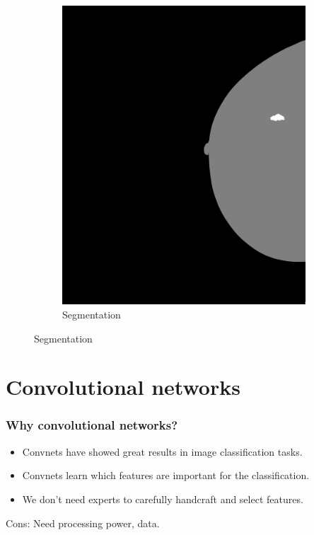 \documentclass{beamer}
\begin{document}
\begin{frame}
\begin{figure}[h]
\begin{subfigure}{0.35\textwidth}
				\includegraphics[width=\textwidth]{plots/label.png}
				\caption{Segmentation}
			\end{subfigure}
		\end{figure}
	\end{frame}
	
	
	\section[Convolutional networks]{Convolutional networks}
	\begin{frame}
	\frametitle{Why convolutional networks?}
		\begin{itemize}
			\item Convnets have showed great results in image classification tasks.
			\item Convnets learn which features are important for the classification. 
	 		\item We don’t need experts to carefully handcraft and select features.
		\end{itemize}
		\vfill
		Cons: Need processing power, data.
	\end{frame}
\end{document}
